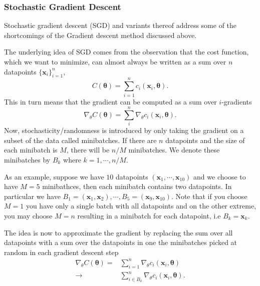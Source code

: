 \documentclass[a4paper, twocolumn]{article}
\begin{document}
\subsubsection{Stochastic Gradient Descent}
Stochastic gradient descent (SGD) and variants thereof address some of the shortcomings of the Gradient descent method discussed above. 

The underlying idea of SGD comes from the observation that the cost function, which we want to minimize, can almost always be 
written as a sum over $n$ datapoints $\{\mathbf{x}_i\}_{i=1}^n$,
\begin{equation}
 C(\mathbf{\theta}) = \sum_{i=1}^n c_i(\mathbf{x}_i, \mathbf{\theta}). 
\end{equation}
This in turn means that the gradient can be computed as a sum over $i$-gradients 
\begin{equation}
\nabla_\theta C(\mathbf{\theta}) = \sum_i^n \nabla_\theta c_i(\mathbf{x}_i, \mathbf{\theta}).  
\end{equation}
Now, stochasticity/randomness is introduced by only taking the gradient on a subset of the data called minibatches.  
If there are $n$ datapoints and the size of each minibatch is $M$, there will be $n/M$ minibatches. We denote these 
minibatches by $B_k$ where $k=1,\cdots,n/M$. 

As an example, suppose we have $10$ datapoints $( \mathbf{x}_1, \cdots, \mathbf{x}_{10} )$ and we choose to have $M=5$
minibathces, then each minibatch contains two datapoints. In particular we have 
$B_1 = (\mathbf{x}_1,\mathbf{x}_2), \cdots, B_5 = (\mathbf{x}_9,\mathbf{x}_{10})$. Note that if you choose $M=1$ you have 
only a single batch with all datapoints and on the other extreme, you may choose $M=n$ resulting in a minibatch for each 
datapoint, i.e $B_k = \mathbf{x}_k$.

The idea is now to approximate the gradient by replacing the sum over all datapoints with a sum over the datapoints in one the 
minibatches picked at random in each gradient descent step
\begin{align}\nabla_\theta C(\mathbf{\theta}) = &\sum_{i=1}^n \nabla_\theta c_i(\mathbf{x}_i, \mathbf{\theta}) \nonumber \\
\rightarrow &\sum_{i \in B_k}^n \nabla_\theta c_i(\mathbf{x}_i, \mathbf{\theta}).
\end{align}
                                                                                                                                                                                                 
\end{document}
